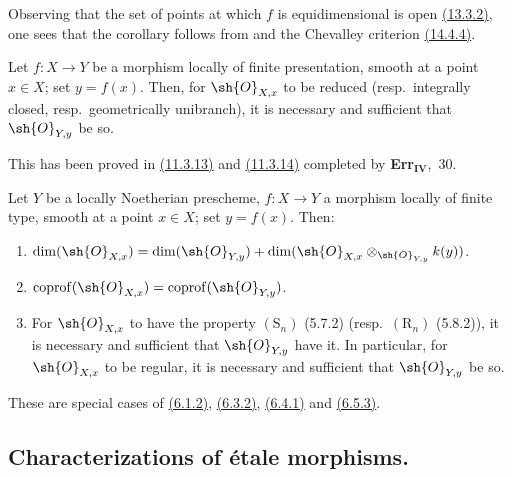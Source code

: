 Observing that the set of points at which $f$ is equidimensional is open {\hyperlink{ega4.c04.def.13-3-2}{(13.3.2)}}, one sees that the corollary follows from  and the Chevalley criterion {\hyperlink{ega4.c04.cor.14-4-4}{(14.4.4)}}.

\begin{proposition}[17.5.7]
\label{IV.17.5.7}
Let $f:X\to Y$ be a morphism locally of finite presentation, smooth at a point $x\in X$; set $y=f(x)$.
Then, for $\sh{O}_{X,x}$ to be reduced (resp.\ integrally closed, resp.\ geometrically unibranch), it is necessary and sufficient that $\sh{O}_{Y,y}$ be so.
\end{proposition}

This has been proved in {\hyperlink{ega4.c04.prop.11-3-13}{(11.3.13)}} and {\hyperlink{ega4.c04.cor.11-3-14}{(11.3.14)}} completed by \textbf{Err}$_\textbf{IV}$,~30.

\begin{proposition}[17.5.8]
\label{IV.17.5.8}
Let $Y$ be a locally Noetherian prescheme, $f:X\to Y$ a morphism locally of finite type, smooth at a point $x\in X$; set $y=f(x)$.
Then:
\begin{enumerate}[label=(\roman*)]
  \item $\dim(\sh{O}_{X,x})=\dim(\sh{O}_{Y,y})+\dim(\sh{O}_{X,x}\otimes_{\sh{O}_{Y,y}}k(y))$.
  \item $\operatorname{coprof}(\sh{O}_{X,x})=\operatorname{coprof}(\sh{O}_{Y,y})$.
  \item For $\sh{O}_{X,x}$ to have the property $(\mathrm{S}_n)$ (5.7.2) (resp.\ $(\mathrm{R}_n)$ (5.8.2)), it is necessary and sufficient that $\sh{O}_{Y,y}$ have it.
  In particular, for $\sh{O}_{X,x}$ to be regular, it is necessary and sufficient that $\sh{O}_{Y,y}$ be so.
\end{enumerate}
\end{proposition}

These are special cases of {\hyperlink{ega4.c04.cor.6-1-2}{(6.1.2)}}, {\hyperlink{ega4.c04.cor.6-3-2}{(6.3.2)}}, {\hyperlink{ega4.c04.prop.6-4-1}{(6.4.1)}} and {\hyperlink{ega4.c04.prop.6-5-3}{(6.5.3)}}.


\subsection{Characterizations of \'etale morphisms.}
\label{subsection:IV.17.6}


